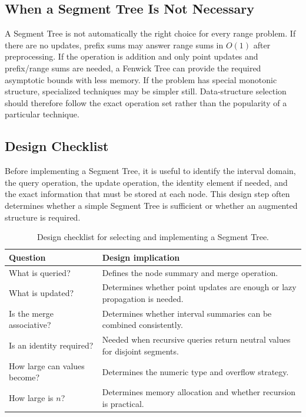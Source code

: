 \documentclass[11pt,open=any,headings=option]{scrreprt}
\begin{document}
\subsection{When a Segment Tree Is Not Necessary}
A Segment Tree is not automatically the right choice for every range problem. If there are no updates, prefix sums may answer range sums in $O(1)$ after preprocessing. If the operation is addition and only point updates and prefix/range sums are needed, a Fenwick Tree can provide the required asymptotic bounds with less memory. If the problem has special monotonic structure, specialized techniques may be simpler still. Data-structure selection should therefore follow the exact operation set rather than the popularity of a particular technique.

\subsection{Design Checklist}
Before implementing a Segment Tree, it is useful to identify the interval domain, the query operation, the update operation, the identity element if needed, and the exact information that must be stored at each node. This design step often determines whether a simple Segment Tree is sufficient or whether an augmented structure is required.

\begin{table}[H]
\centering
\caption{Design checklist for selecting and implementing a Segment Tree.}
\label{tab:checklist}
\begin{tabular}{p{4.2cm}p{8.1cm}}
\toprule
\textbf{Question} & \textbf{Design implication}\\
\midrule
What is queried? & Defines the node summary and merge operation.\\
What is updated? & Determines whether point updates are enough or lazy propagation is needed.\\
Is the merge associative? & Determines whether interval summaries can be combined consistently.\\
Is an identity required? & Needed when recursive queries return neutral values for disjoint segments.\\
How large can values become? & Determines the numeric type and overflow strategy.\\
How large is $n$? & Determines memory allocation and whether recursion is practical.\\
\bottomrule
\end{tabular}
\end{table}
\end{document}
